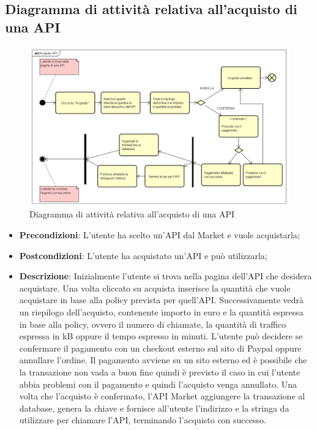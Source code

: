 \newpage
\subsection{Diagramma di attività relativa all'acquisto di una API}
\begin{figure}[H]
	\centering
	\includegraphics[width=1.0\linewidth]{"IMG/Acquisto API"}
	\caption{Diagramma di attività relativa all'acquisto di una API}
\end{figure}

\begin{itemize}
	\item \textbf{Precondizioni}: L'utente ha scelto un'API dal Market e vuole acquistarla;
	\item \textbf{Postcondizioni}: L'utente ha acquistato un'API e può utilizzarla;
	\item \textbf{Descrizione}: Inizialmente l'utente si trova nella pagina dell'API che desidera acquistare. Una volta cliccato su acquista inserisce la quantità che vuole acquistare in base alla policy prevista per quell'API. Successivamente vedrà un riepilogo dell'acquisto, contenente importo in euro e la quantità espressa in base alla policy, ovvero il numero di chiamate, la quantità di traffico espressa in kB oppure il tempo espresso in minuti. L'utente può decidere se confermare il pagamento con un checkout esterno sul sito di Paypal oppure annullare l'ordine. Il pagamento avviene su un sito esterno ed è possibile che la transazione non vada a buon fine quindi è previsto il caso in cui l'utente abbia problemi con il pagamento e quindi l'acquisto venga annullato. Una volta che l'acquisto è confermato, l'API Market aggiungere la transazione al database, genera la chiave e fornisce all'utente l'indirizzo e la stringa da utilizzare per chiamare l'API, terminando l'acquisto con successo. 
\end{itemize}

